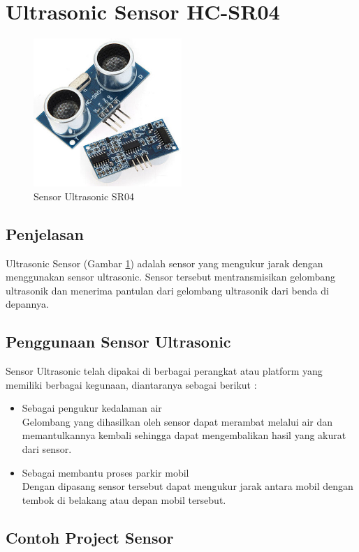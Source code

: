 \documentclass{article}
\begin{document}
\section{Ultrasonic Sensor HC-SR04}
\begin{figure}[ht]
\centerline{\includegraphics[width=0.5\textwidth]{figures/sensor.jpg}}
\caption{Sensor Ultrasonic SR04}
\label{sensor}
\end{figure}
\subsection{Penjelasan}
Ultrasonic Sensor (Gambar \ref{sensor}) adalah sensor yang mengukur jarak dengan menggunakan sensor ultrasonic. Sensor tersebut mentransmisikan gelombang ultrasonik dan menerima pantulan dari gelombang ultrasonik dari benda di depannya. 
\subsection{Penggunaan Sensor Ultrasonic}
Sensor Ultrasonic telah dipakai di berbagai perangkat atau platform yang memiliki berbagai kegunaan, diantaranya sebagai berikut : 
\begin{itemize}
	\item Sebagai pengukur kedalaman air \\ Gelombang yang dihasilkan oleh sensor dapat merambat melalui air dan memantulkannya kembali sehingga dapat mengembalikan hasil yang akurat dari sensor.
	\item Sebagai membantu proses parkir mobil \\  Dengan dipasang sensor tersebut dapat mengukur jarak antara mobil dengan tembok di belakang atau depan mobil tersebut.
\end{itemize}
\subsection{Contoh Project Sensor}
\end{document}
